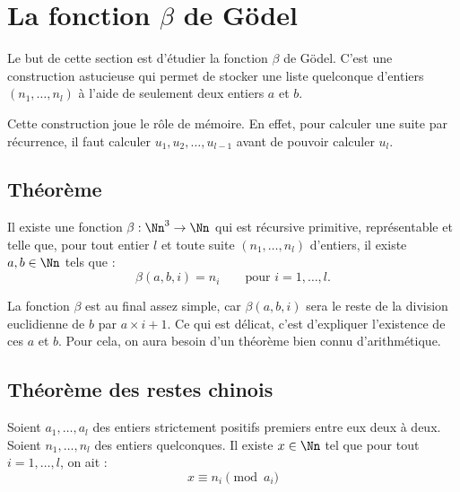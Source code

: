 \documentclass[11pt,class=report,crop=false]{standalone}
\begin{document}
\section{La fonction $\beta$ de Gödel}

Le but de cette section est d'étudier la fonction $\beta$ de Gödel.
C'est une construction astucieuse qui permet de stocker une liste quelconque d'entiers $(n_1, \dots, n_l)$ à l'aide de seulement deux entiers $a$ et $b$.

Cette construction joue le rôle de mémoire. En effet, pour calculer une suite par récurrence, il faut calculer $u_1, u_2, \dots, u_{l-1}$ avant de pouvoir calculer $u_l$.

\subsection{Théorème}

\begin{theoreme}
    Il existe une fonction $\beta : \Nn^3 \to \Nn$ qui est récursive primitive, représentable et telle que, pour tout entier $l$ et toute suite $(n_1, \dots, n_l)$ d'entiers, il existe $a, b \in \Nn$ tels que :
    \[ \beta(a, b, i) = n_i \qquad \text{pour } i=1, \dots, l. \]
\end{theoreme}


La fonction $\beta$ est au final assez simple, car $\beta(a, b, i)$ sera le reste de la division euclidienne de $b$ par $a \times i + 1$. 
Ce qui est délicat, c'est d'expliquer l'existence de ces $a$ et $b$. 
Pour cela, on aura besoin d'un théorème bien connu d'arithmétique.

\subsection{Théorème des restes chinois}

\begin{theoreme}
    Soient $a_1, \dots, a_l$ des entiers strictement positifs premiers entre eux deux à deux.
    Soient $n_1, \dots, n_l$ des entiers quelconques.
    Il existe $x \in \Nn$ tel que pour tout $i = 1, \dots, l$, on ait :
    \[ x \equiv n_i \pmod{a_i} \]
\end{theoreme}
\end{document}
